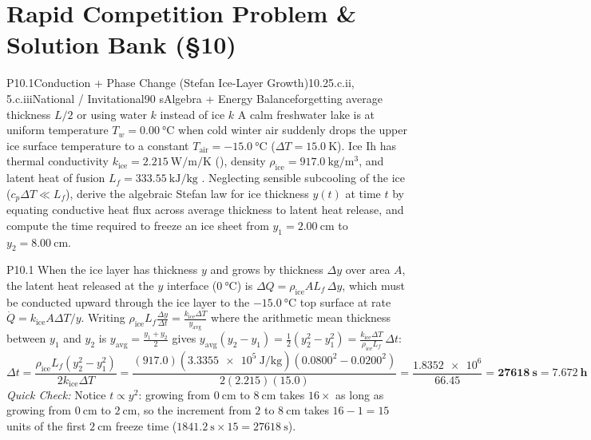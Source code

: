 \section{Rapid Competition Problem \& Solution Bank (§10)}
\label{sec:10.7}

\begin{problem}{P10.1}{Conduction + Phase Change (Stefan Ice-Layer Growth)}{10.2}{5.c.ii, 5.c.iii}{National / Invitational}{90 s}{Algebra + Energy Balance}{forgetting average thickness $L/2$ or using water $k$ instead of ice $k$}
A calm freshwater lake is at uniform temperature $T_w = \SI{0.00}{\celsius}$ when cold winter air suddenly drops the upper ice surface temperature to a constant $T_{\mathrm{air}} = \SI{-15.0}{\celsius}$ ($\Delta T = \SI{15.0}{\kelvin}$). Ice Ih has thermal conductivity $k_{\mathrm{ice}} = \SI{2.215}{\watt\per\meter\per\kelvin}$ (), density $\rho_{\mathrm{ice}} = \SI{917.0}{\kilogram\per\cubic\meter}$, and latent heat of fusion $L_f = \SI{333.55}{\kilo\joule\per\kilogram}$ . Neglecting sensible subcooling of the ice ($c_p\Delta T \ll L_f$), derive the algebraic Stefan law for ice thickness $y(t)$ at time $t$ by equating conductive heat flux across average thickness to latent heat release, and compute the time required to freeze an ice sheet from $y_1 = \SI{2.00}{\centi\meter}$ to $y_2 = \SI{8.00}{\centi\meter}$.
\end{problem}
\begin{solution}{P10.1}
When the ice layer has thickness $y$ and grows by thickness $\Delta y$ over area $A$, the latent heat released at the $y$ interface ($\SI{0}{\celsius}$) is $\Delta Q = \rho_{\mathrm{ice}} A L_f\,\Delta y$, which must be conducted upward through the ice layer to the $\SI{-15.0}{\celsius}$ top surface at rate $\dot{Q} = k_{\mathrm{ice}} A \Delta T / y$. Writing $\rho_{\mathrm{ice}} L_f \frac{\Delta y}{\Delta t} = \frac{k_{\mathrm{ice}}\Delta T}{y_{\mathrm{avg}}}$ where the arithmetic mean thickness between $y_1$ and $y_2$ is $y_{\mathrm{avg}} = \frac{y_1 + y_2}{2}$ gives $y_{\mathrm{avg}}(y_2 - y_1) = \frac{1}{2}(y_2^2 - y_1^2) = \frac{k_{\mathrm{ice}}\Delta T}{\rho_{\mathrm{ice}} L_f}\,\Delta t$:
\[
  \Delta t = \frac{\rho_{\mathrm{ice}} L_f \left(y_2^2 - y_1^2\right)}{2 k_{\mathrm{ice}} \Delta T} = \frac{(917.0)(\SI{3.3355e5}{\joule\per\kilogram})\left(0.0800^2 - 0.0200^2\right)}{2(2.215)(15.0)} = \frac{\num{1.8352e6}}{66.45} = \mathbf{\SI{27618}{\second}} = \mathbf{\SI{7.672}{\hour}}
\]
\emph{Quick Check:} Notice $t \propto y^2$: growing from $\SI{0}{\centi\meter}$ to $\SI{8}{\centi\meter}$ takes $16\times$ as long as growing from $\SI{0}{\centi\meter}$ to $\SI{2}{\centi\meter}$, so the increment from $2$ to $\SI{8}{\centi\meter}$ takes $16 - 1 = 15$ units of the first $\SI{2}{\centi\meter}$ freeze time ($\SI{1841.2}{\second} \times 15 = \SI{27618}{\second}$).
\end{solution}

